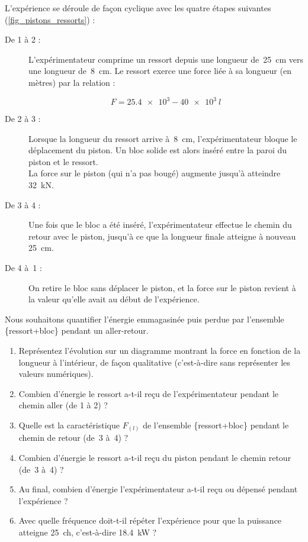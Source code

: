 	L’expérience se déroule de façon cyclique avec les quatre étapes suivantes (\cref{fig_pistons_ressorts}) :
	
	\begin{description}
		\item[De 1 à 2 :] L’expérimentateur comprime un ressort depuis une longueur de~\SI{25}{\centi\metre} vers une longueur de~\SI{8}{\centi\metre}.
		Le ressort exerce une force liée à sa longueur (en mètres) par la relation :
		
		\begin{equation}
			F = \num{25,4e3} - \num{40e3} \ l
		\end{equation}
		

		\item[De 2 à 3 :] Lorsque la longueur du ressort arrive à~\SI{8}{\centi\metre}, l’expérimentateur bloque le déplacement du piston. Un bloc solide est alors inséré entre la paroi du piston et le ressort. \\
		La force sur le piston (qui n’a pas bougé) augmente jusqu’à atteindre \SI{32}{\kilo\newton}.
		
		\item[De 3 à 4 :] Une fois que le bloc a été inséré, l’expérimentateur effectue le chemin du retour avec le piston, jusqu’à ce que la longueur finale atteigne à nouveau \SI{25}{\centi\metre}.
		
		\item[De 4 à~1 :] On retire le bloc sans déplacer le piston, et la force sur le piston revient à la valeur qu’elle avait au début de l’expérience.
	\end{description}
	
	Nous souhaitons quantifier l’énergie emmagasinée puis perdue par l’ensemble \{ressort+bloc\} pendant un aller-retour.
	
	\begin{enumerate}
		\item Représentez l’évolution sur un diagramme montrant la force en fonction de la longueur à l’intérieur, de façon qualitative (c’est-à-dire sans représenter les valeurs numériques).
		\item Combien d’énergie le ressort a-t-il reçu de l’expérimentateur pendant le chemin aller (de 1 à 2) ?
		\item Quelle est la caractéristique $F_{(l)}$ de l’ensemble \{ressort+bloc\} pendant le chemin de retour (de~3 à~4) ?
		\item Combien d’énergie le ressort a-t-il reçu du piston pendant le chemin retour (de~3 à~4) ?
		\item Au final, combien d’énergie l’expérimentateur a-t-il reçu ou dépensé pendant l’expé\-rience ?
		\item Avec quelle fréquence doit-t-il répéter l’expérience pour que la puissance atteigne \SI{25}{ch}, c’est-à-dire \SI{18,4}{\kilo\watt} ?
	\end{enumerate}


